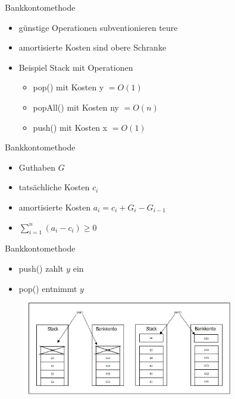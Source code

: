 \documentclass[11pt]{beamer}
\begin{document}
	\begin{frame} {Bankkontomethode}
		
		\begin{itemize}
			\item günstige Operationen subventionieren teure
			\item amortisierte Kosten sind obere Schranke
			\pause
			\item Beispiel Stack mit Operationen
				\begin{itemize}
				\item pop() mit Kosten y $= O(1)$
				\item popAll() mit Kosten ny $= O(n)$
				\item push() mit Kosten x $ = O(1)$
	
			\end{itemize}	
				
		\end{itemize}	
	
	\end{frame}	
	
	\begin{frame}{Bankkontomethode}
		\begin{itemize}
			\item Guthaben $G$
			\item tatsächliche Kosten $c_i$
			\item amortisierte Kosten $a_i = c_i + G_i - G_{i-1} $
			\item  $\sum \limits_{i=1}^n (a_{i} - c_{i})  \geq 0$
		\end{itemize}	
		
	\end{frame}	
	

	\begin{frame}{Bankkontomethode}
		\begin{multicols}{2}
			\begin{itemize}
				\item push() zahlt $y$ ein
				\item pop() entnimmt $y$
			\end{itemize}
		\end{multicols}
		\begin{figure}[h]
			\centering
			\includegraphics[width=0.8\textwidth]{"bilder/bankkontomethode"}	
		\end{figure}
	\end{frame}	
	
\end{document}
